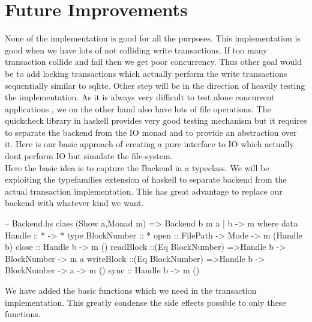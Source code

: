 \documentclass[11pt,a4paper]{article}
\begin{document}
\section{Future Improvements}
None of the implementation is good for all the purposes. This implementation is good when we have lots of not colliding write transactions. If too many transaction collide and fail then we get poor concurrency. Thus other goal would be to add locking transactions which actually perform the write transactions sequentially similar to sqlite. 
Other step will be in the direction of heavily testing the implementation. As it is always very difficult to test alone concurrent applications , we on the other hand also have lots of file operations. The quickcheck library in haskell provides very good testing mechanism but it requires to separate the backend from the IO monad and to provide an abstraction over it.
Here is our basic approach of creating a pure interface to IO which actually dont perform IO but simulate the file-system. \\
Here the basic idea is to capture the Backend in a typeclass. We will be exploiting the typefamilies extension of haskell to separate backend from the actual transaction implementation. This has great advantage to replace our backend with whatever kind we want.\\ 
\begin{code}[name=Backend,firstnumber=1]
-- Backend.hs
class (Show a,Monad m) => Backend b m a | b -> m where 
    data Handle :: * -> * 
    type BlockNumber :: *  
    open :: FilePath -> Mode -> m (Handle b)
    close :: Handle b -> m () 
    readBlock ::(Eq BlockNumber) =>Handle b -> BlockNumber -> m a 
    writeBlock ::(Eq BlockNumber) =>Handle b -> BlockNumber -> a -> m ()
    sync :: Handle b -> m ()
\end{code}
We have added the basic functions which we need in the transaction implementation. This greatly condense the side effects possible to only these functions.
\end{document}
